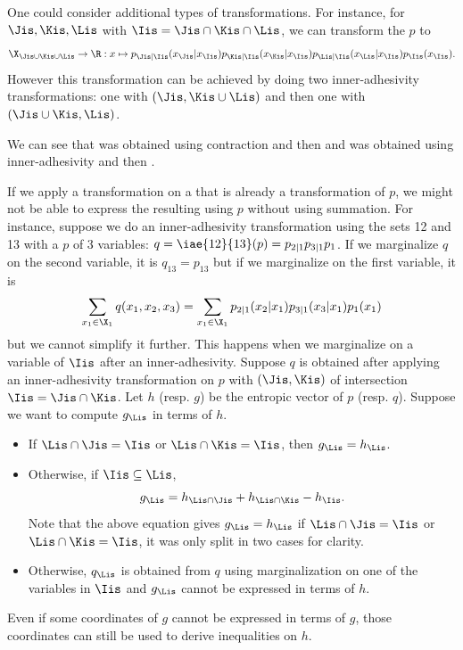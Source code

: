 \documentclass[11pt,twoside,a4paper,openright]{uclouvain-thesis}
\begin{document}
One could consider additional types of transformations.
For instance,
for $\Jis, \Kis, \Lis$ with $\Iis = \Jis \cap \Kis \cap \Lis$, we can transform the \pmf{} $p$ to
\[ \X_{\Jis\cup\Kis\cup\Lis} \to \R : x \mapsto p_{\Jis|\Iis}(x_{\Jis}|x_{\Iis})p_{\Kis|\Iis}(x_{\Kis}|x_{\Iis})p_{\Lis|\Iis}(x_{\Lis}|x_{\Iis})p_{\Iis}(x_{\Iis}). \]
However this transformation can be achieved by doing two inner-adhesivity transformations:
one with $(\Jis,\Kis\cup\Lis)$ and then one with $(\Jis\cup\Kis,\Lis)$.

We can see that  was obtained using contraction and then 
and  was obtained using inner-adhesivity and then .

If we apply a transformation on a \pmf{} that is already a transformation of $p$,
we might not be able to express the resulting \pmf{} using $p$ without using summation.
For instance, suppose we do an inner-adhesivity transformation using the sets 12 and 13 with a \pmf{} $p$ of 3 variables:
$q = \iae{12}{13}(p) = p_{2|1}p_{3|1}p_1$.
If we marginalize $q$ on the second variable, it is $q_{13} = p_{13}$ but if we marginalize on the first variable,
it is
\[ \sum_{x_1 \in \X_1} q(x_1,x_2,x_3) = \sum_{x_1 \in \X_1} p_{2|1}(x_2|x_1)p_{3|1}(x_3|x_1)p_1(x_1) \]
but we cannot simplify it further.
This happens when we marginalize on a variable of $\Iis$ after an inner-adhesivity.
Suppose $q$ is obtained after applying an inner-adhesivity transformation on $p$ with $(\Jis,\Kis)$ of intersection $\Iis = \Jis \cap \Kis$.
Let $h$ (resp. $g$) be the entropic vector of $p$ (resp. $q$).
Suppose we want to compute $g_{\Lis}$ in terms of $h$.
\begin{itemize}
  \item If $\Lis \cap \Jis = \Iis$ or $\Lis \cap \Kis = \Iis$,
    then $g_{\Lis} = h_{\Lis}$.
  \item Otherwise, if $\Iis \subseteq \Lis$,
    \[ g_{\Lis} = h_{\Lis \cap \Jis} + h_{\Lis \cap \Kis} - h_{\Iis}. \]
    Note that the above equation gives $g_{\Lis} = h_{\Lis}$ if
    $\Lis \cap \Jis = \Iis$ or $\Lis \cap \Kis = \Iis$, it was only split in two cases for clarity.
  \item Otherwise, $q_{\Lis}$ is obtained from $q$ using marginalization on one of the variables in $\Iis$
    and $g_{\Lis}$ cannot be expressed in terms of $h$.
\end{itemize}
Even if some coordinates of $g$ cannot be expressed in terms of $g$, those coordinates can still be used to derive inequalities on $h$.
\end{document}
